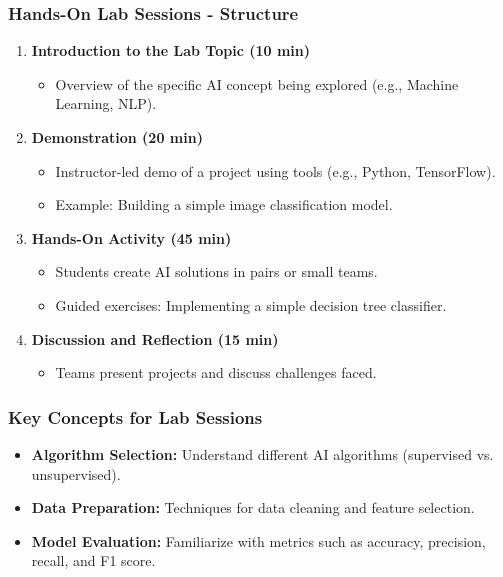 \documentclass[aspectratio=169]{beamer}
\begin{document}
\begin{frame}
    \frametitle{Hands-On Lab Sessions - Structure}
    \begin{enumerate}
        \item \textbf{Introduction to the Lab Topic (10 min)}
            \begin{itemize}
                \item Overview of the specific AI concept being explored (e.g., Machine Learning, NLP).
            \end{itemize}
        \item \textbf{Demonstration (20 min)}
            \begin{itemize}
                \item Instructor-led demo of a project using tools (e.g., Python, TensorFlow).
                \item Example: Building a simple image classification model.
            \end{itemize}
        \item \textbf{Hands-On Activity (45 min)}
            \begin{itemize}
                \item Students create AI solutions in pairs or small teams. 
                \item Guided exercises: Implementing a simple decision tree classifier.
            \end{itemize}
        \item \textbf{Discussion and Reflection (15 min)}
            \begin{itemize}
                \item Teams present projects and discuss challenges faced.
            \end{itemize}
    \end{enumerate}
\end{frame}

\begin{frame}
    \frametitle{Key Concepts for Lab Sessions}
    \begin{itemize}
        \item \textbf{Algorithm Selection:} Understand different AI algorithms (supervised vs. unsupervised).
        \item \textbf{Data Preparation:} Techniques for data cleaning and feature selection.
        \item \textbf{Model Evaluation:} Familiarize with metrics such as accuracy, precision, recall, and F1 score.
    \end{itemize}
\end{frame}
\end{document}
